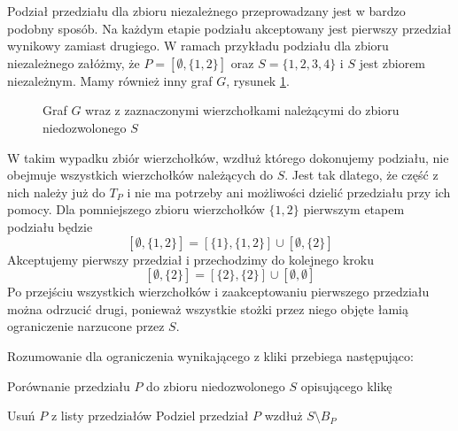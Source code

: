 Podział przedziału dla zbioru niezależnego przeprowadzany jest w bardzo podobny sposób. Na każdym etapie podziału akceptowany jest pierwszy przedział wynikowy zamiast drugiego. W ramach przykładu podziału dla zbioru niezależnego załóżmy, że 
$P = [\emptyset,\{1,2\}]$ oraz $S = \{1,2,3,4\}$ i $S$ jest zbiorem niezależnym. Mamy również inny graf $G$, rysunek \ref{roszerzenieN}.
\begin{figure}[H]
  \centering
    \caption{Graf $G$ wraz z zaznaczonymi wierzchołkami należącymi do zbioru niedozwolonego $S$}
    \label{roszerzenieN}
 \end{figure}
 

W takim wypadku zbiór wierzchołków, wzdłuż którego dokonujemy podziału, nie obejmuje wszystkich wierzchołków należących do $S$. Jest tak dlatego, że część z nich należy już do $T_P$ i nie ma potrzeby ani możliwości dzielić przedziału przy ich pomocy. Dla pomniejszego zbioru wierzchołków $\{1,2\}$ pierwszym etapem podziału będzie 
$$[{\emptyset},\{1,2\}]= [\{1\},\{1,2\}] \cup [{\emptyset},\{2\}]$$ Akceptujemy pierwszy przedział i przechodzimy do kolejnego kroku
$$ [{\emptyset},\{2\}]= [\{2\},\{2\}] \cup [{\emptyset},{\emptyset}]$$ Po przejściu wszystkich wierzchołków i zaakceptowaniu pierwszego przedziału można odrzucić drugi, ponieważ wszystkie stożki przez niego objęte łamią ograniczenie narzucone przez $S$.


Rozumowanie dla ograniczenia wynikającego z kliki przebiega następująco:
\begin{algorithm}[H]
  \caption{Porównanie przedziału $P$ do zbioru niedozwolonego $S$ opisującego klikę}
  \begin{algorithmic}
	  \STATE Usuń $P$ z listy przedziałów
	\ELSE
	  \STATE Podziel przedział $P$ wzdłuż $S \setminus B_P  $
  	\ENDIF
  \ENDIF  
  \end{algorithmic}
\end{algorithm}

